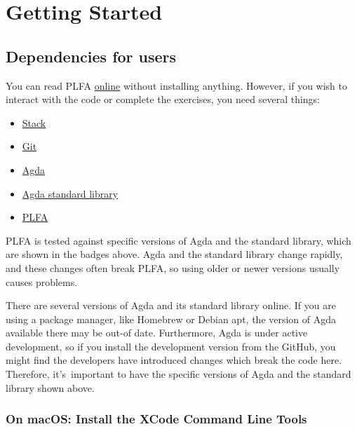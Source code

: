 \hypertarget{GettingStarted}{%
\chapter{Getting Started}\label{GettingStarted}}

\hypertarget{dependencies-for-users}{%
\section{Dependencies for users}\label{dependencies-for-users}}

You can read PLFA \href{http://plfa.inf.ed.ac.uk}{online} without
installing anything. However, if you wish to interact with the code or
complete the exercises, you need several things:

\begin{itemize}
\tightlist
\item
  \protect\hyperlink{install-the-haskell-tool-stack}{Stack}
\item
  \protect\hyperlink{install-git}{Git}
\item
  \protect\hyperlink{install-agda-using-stack}{Agda}
\item
  \protect\hyperlink{install-plfa-and-the-agda-standard-library}{Agda
  standard library}
\item
  \protect\hyperlink{install-plfa-and-the-agda-standard-library}{PLFA}
\end{itemize}

PLFA is tested against specific versions of Agda and the standard
library, which are shown in the badges above. Agda and the standard
library change rapidly, and these changes often break PLFA, so using
older or newer versions usually causes problems.

There are several versions of Agda and its standard library online. If
you are using a package manager, like Homebrew or Debian apt, the
version of Agda available there may be out-of date. Furthermore, Agda is
under active development, so if you install the development version from
the GitHub, you might find the developers have introduced changes which
break the code here. Therefore, it's~important to have the specific
versions of Agda and the standard library shown above.

\hypertarget{on-macos-install-the-xcode-command-line-tools}{%
\subsection{On macOS: Install the XCode Command Line
Tools}\label{on-macos-install-the-xcode-command-line-tools}}

